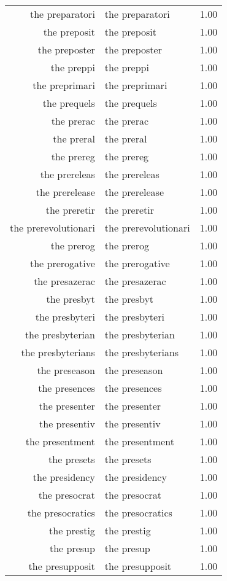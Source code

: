 \begin{table}[ht]
\begin{tabular}{rlr}
  the preparatori & the preparatori & 1.00 \\ 
  the preposit & the preposit & 1.00 \\ 
  the preposter & the preposter & 1.00 \\ 
  the preppi & the preppi & 1.00 \\ 
  the preprimari & the preprimari & 1.00 \\ 
  the prequels & the prequels & 1.00 \\ 
  the prerac & the prerac & 1.00 \\ 
  the preral & the preral & 1.00 \\ 
  the prereg & the prereg & 1.00 \\ 
  the prereleas & the prereleas & 1.00 \\ 
  the prerelease & the prerelease & 1.00 \\ 
  the preretir & the preretir & 1.00 \\ 
  the prerevolutionari & the prerevolutionari & 1.00 \\ 
  the prerog & the prerog & 1.00 \\ 
  the prerogative & the prerogative & 1.00 \\ 
  the presazerac & the presazerac & 1.00 \\ 
  the presbyt & the presbyt & 1.00 \\ 
  the presbyteri & the presbyteri & 1.00 \\ 
  the presbyterian & the presbyterian & 1.00 \\ 
  the presbyterians & the presbyterians & 1.00 \\ 
  the preseason & the preseason & 1.00 \\ 
  the presences & the presences & 1.00 \\ 
  the presenter & the presenter & 1.00 \\ 
  the presentiv & the presentiv & 1.00 \\ 
  the presentment & the presentment & 1.00 \\ 
  the presets & the presets & 1.00 \\ 
  the presidency & the presidency & 1.00 \\ 
  the presocrat & the presocrat & 1.00 \\ 
  the presocratics & the presocratics & 1.00 \\ 
  the prestig & the prestig & 1.00 \\ 
  the presup & the presup & 1.00 \\ 
  the presupposit & the presupposit & 1.00 \\ 

\end{tabular}
\end{table}

